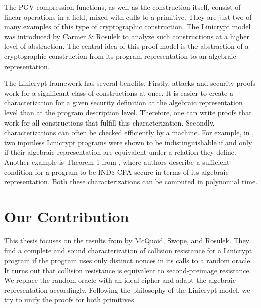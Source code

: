 The PGV compression functions, as well as the \MD construction itself, consist of linear operations in a field,
mixed with calls to a primitive.
They are just two of many examples of this type of cryptographic construction.
The Linicrypt model was introduced by Carmer \& Rosulek \cite{C:CarRos16} to analyze such constructions at a higher level of abstraction.
The central idea of this proof model is the abstraction of a cryptographic construction from its program representation to an algebraic representation.

The Linicrypt framework has several benefits.
Firstly, attacks and security proofs work for a significant class of constructions at once.
It is easier to create a characterization for a given security definition at the algebraic representation level than at the program description level. 
Therefore, one can write proofs that work for all constructions that fulfill this characterization.
Secondly, characterizations can often be checked efficiently by a machine.
For example, in \cite{C:CarRos16},
two inputless Linicrypt programs were shown to be indistinguishable if and only if their algebraic representation are equivalent under a relation they define.
Another example is Theorem 1 from \cite{EPRINT:HolRosRoy22},
where authors describe a sufficient condition for a program to be IND\$-CPA secure in terms of its algebraic representation.
Both these characterizations can be computed in polynomial time.

\section{Our Contribution}

This thesis focuses on the results from \cite{TCC:McQSwoRos19} by McQuoid, Swope, and Rosulek.
They find a complete and sound characterization of collision resistance for a Linicrypt program
if the program uses only distinct nonces in its calls to a random oracle.
It turns out that collision resistance is equivalent to second-preimage resistance.
We replace the random oracle with an ideal cipher and adapt the algebraic representation accordingly.
Following the philosophy of the Linicrypt model,
we try to unify the proofs for both primitives.




